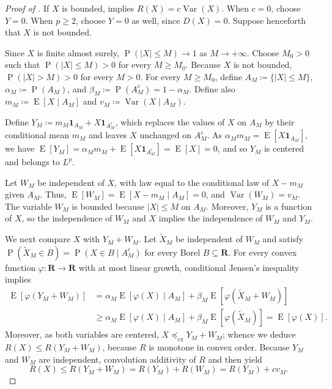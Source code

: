 \documentclass[11pt]{amsart}
\theoremstyle{plain}
\theoremstyle{definition}
\theoremstyle{remark}
\numberwithin{equation}{section}
\newcommand{\1}{\mathbf 1}
\begin{document}
\begin{proof}[Proof of ]
If \(X\) is bounded,  implies \(R(X)=c\operatorname{Var}(X)\). When \(c=0\), choose \(Y=0\). When \(p\geq2\), choose \(Y=0\) as well, since \(D(X)=0\). Suppose henceforth that \(X\) is not bounded.


Since \(X\) is finite almost surely,
\(\operatorname{P}(|X|\leq M)\to1\) as \(M\to+\infty\). Choose \(M_0>0\) such that
\(\operatorname{P}(|X|\leq M)>0\) for every \(M\geq M_0\). Because \(X\) is not bounded, \(\operatorname{P}(|X|>M)>0\) for every \(M>0\). For every \(M\geq M_0\), define
\(A_M\coloneqq\{|X|\leq M\}\), \(\alpha_M\coloneqq\operatorname{P}(A_M)\), and \(\beta_M\coloneqq\operatorname{P}(A_M^c)=1-\alpha_M\). Define also \(m_M\coloneqq\operatorname{E}[X\mid A_M]\) and \(v_M\coloneqq\operatorname{Var}(X\mid A_M)\).

Define \(Y_M\coloneqq m_M\mathbf 1_{A_M}+X\mathbf 1_{A_M^c}\), which replaces the values of \(X\) on \(A_M\) by their conditional mean \(m_M\) and leaves \(X\) unchanged on \(A_M^c\). As \(\alpha_Mm_M=\operatorname{E}[X\mathbf 1_{A_M}]\), we have \(\operatorname{E}[Y_M]
=
\alpha_Mm_M+\operatorname{E}[X\mathbf 1_{A_M^c}]
=
\operatorname{E}[X]
=
0\), and so \(Y_M\) is centered and belongs to \(L^p\).

Let \(W_M\) be independent of \(X\), with law equal to the conditional law of \(X-m_M\) given \(A_M\). Thus, \(\operatorname{E}[W_M]
=
\operatorname{E}[X-m_M\mid A_M]
=
0\), and \(\operatorname{Var}(W_M)=v_M\). The variable \(W_M\) is bounded because \(|X|\leq M\) on \(A_M\). Moreover, \(Y_M\) is a function of \(X\), so the independence of \(W_M\) and \(X\) implies the independence of \(W_M\) and \(Y_M\).

We next compare \(X\) with \(Y_M+W_M\). Let \(\widetilde X_M\) be independent of \(W_M\) and satisfy \(\operatorname{P}(\widetilde X_M\in B) = \operatorname{P}(X\in B\mid A_M^c)\) for every Borel \(B\subseteq\mathbf R\). For every convex function \(\varphi\colon\mathbf R\to\mathbf R\) with at most linear growth, conditional Jensen's inequality implies
\[
\begin{aligned}
\operatorname{E}\left[\varphi(Y_M+W_M)\right]
&=\alpha_M\operatorname{E}\left[\varphi(X)\mid A_M\right]
+\beta_M\operatorname{E}\left[\varphi(\widetilde X_M+W_M)\right]\\
&\geq\alpha_M\operatorname{E}\left[\varphi(X)\mid A_M\right]
+\beta_M\operatorname{E}\left[\varphi(\widetilde X_M)\right] =\operatorname{E}\left[\varphi(X)\right].
\end{aligned}
\]
Moreover, as both variables are centered, \(X\preceq_{\mathrm{cx}}Y_M+W_M\); whence we deduce \(R(X)\leq R(Y_M+W_M)\), because \(R\) is monotone in convex order. Because \(Y_M\) and \(W_M\) are independent, convolution additivity of \(R\) and  then yield
\[
R(X)
\leq
R(Y_M+W_M)
=
R(Y_M)+R(W_M)
=
R(Y_M)+cv_M.
\tag{2}\label{eq:compression-risk-bound}
\]


\end{proof}
\end{document}
